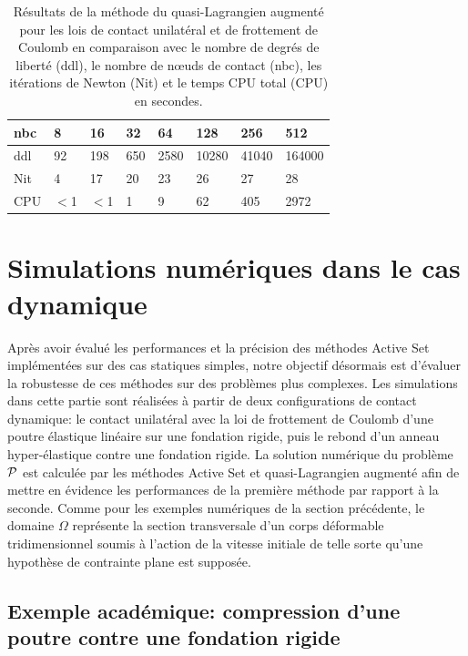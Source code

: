 \begin{table}[htbp!]
\begin{tabular}{ |p{1.25cm}|p{1.25cm}|p{1.25cm}|p{1.25cm}|p{1.25cm}|p{1.25cm}|p{1.25cm}|p{1.25cm}| }
 \hline \rowcolor{lightgray}
			nbc & 8 & 16 & 32 & 64 & 128 & 256 & 512 \\
			\hline
			ddl & 92 & 198 & 650 & 2580 & 10280 & 41040 & 164000 \\
			Nit &  4 & 17 & 20 & 23 & 26 & 27 & 28 \\
			CPU &  $<$1 & $<$1 & 1 & 9 & 62 & 405 & 2972  \\
\hline
\end{tabular}
	\caption{Résultats de la méthode du quasi-Lagrangien augmenté pour les lois de contact unilatéral et de frottement de Coulomb en comparaison avec le nombre de degrés de liberté (ddl), le nombre de nœuds de contact (nbc), les itérations de Newton (Nit) et le temps CPU total (CPU) en secondes.} \label{tab4_def}
\end{table}

\section{Simulations numériques dans le cas dynamique}\label{simu_dynam}

Après avoir évalué les performances et la précision des méthodes Active Set implémentées sur des cas statiques simples, notre objectif désormais est d'évaluer la robustesse de ces méthodes sur des problèmes plus complexes. Les simulations dans cette partie sont réalisées à partir de deux configurations de contact dynamique: le contact unilatéral avec la loi de frottement de Coulomb d'une poutre élastique linéaire sur une fondation rigide, puis le rebond d'un anneau hyper-élastique contre une fondation rigide. La solution numérique du problème ${\cal P}$ est calculée par les méthodes Active Set et quasi-Lagrangien augmenté afin de mettre en évidence les performances de la première méthode par rapport à la seconde.
Comme pour les exemples numériques de la section précédente, le domaine $\Omega$ représente la section transversale d'un corps déformable tridimensionnel soumis à l'action de la vitesse initiale de telle sorte qu'une hypothèse de contrainte plane est supposée.


\subsection{Exemple académique: compression d'une poutre contre une fondation rigide}

